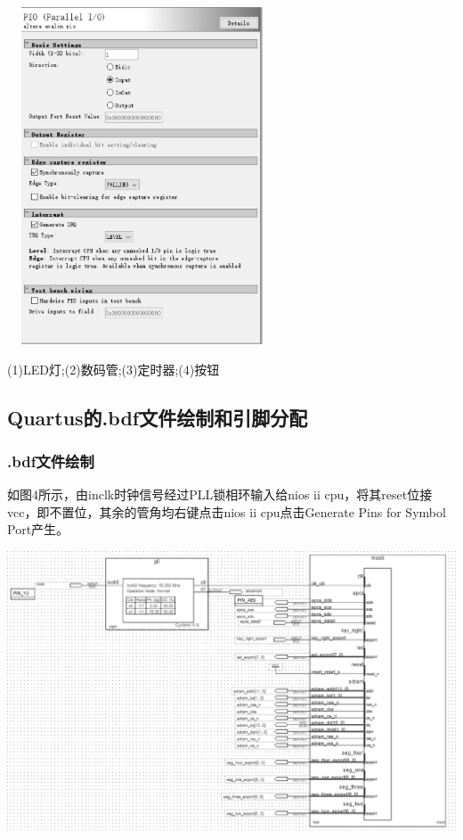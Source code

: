 \documentclass[UTF8]{ctexart}
\makeatletter
\newcommand{\figcaption}{\def\@captype{figure}\caption}
\makeatother
\begin{document}
\begin{center}
	\includegraphics[width=8cm,height=10cm]{key.eps}
	\figcaption{各个连接部件参数}\label{detail.eps}
	(1)LED灯;(2)数码管;(3)定时器;(4)按钮
\end{center}	
\subsection{Quartus的.bdf文件绘制和引脚分配}
\subsubsection{.bdf文件绘制}
如图4所示，由inclk时钟信号经过PLL锁相环输入给nios ii cpu，将其reset位接vcc，即不置位，其余的管角均右键点击nios ii cpu点击Generate Pins for Symbol Port产生。
\begin{center}
	\includegraphics[width=16cm]{bdf.eps}
	\figcaption{bdf文件绘制}\label{bdf.eps}
\end{center}
\end{document}

